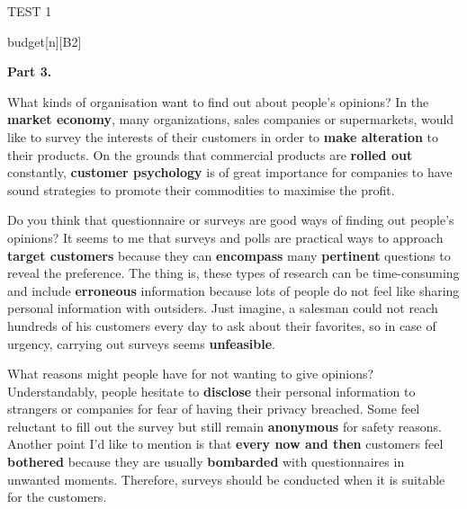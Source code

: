 \begin{glossarymc}[Cambridge 8]
\begin{test}{TEST 1}
\begin{VocabExplain}[Part 2]
            \begin{ExplainCard}{budget}[n][B2]
            \end{ExplainCard}
        \end{VocabExplain}

    \noindent
    \textbf{Part 3.}
    \begin{qa}{What kinds of organisation want to find out about people's opinions?}
    In the \textbf{market economy}, many organizations, sales companies or supermarkets, would like to survey the interests of their customers in order to \textbf{make alteration} to their products. On the grounds that commercial products are \textbf{rolled out} constantly, \textbf{customer psychology} is of great importance for companies to have sound strategies to promote their commodities to maximise the profit.
    \end{qa}

    \begin{qa}{Do you think that questionnaire or surveys are good ways of finding out people's opinions?}
    It seems to me that surveys and polls are practical ways to approach \textbf{target customers} because they can \textbf{encompass} many \textbf{pertinent} questions to reveal the preference. The thing is, these types of research can be time-consuming and include \textbf{erroneous} information because lots of people do not feel like sharing personal information with outsiders. Just imagine, a salesman could not reach hundreds of his customers every day to ask about their favorites, so in case of urgency, carrying out surveys seems \textbf{unfeasible}.
    \end{qa}

    \begin{qa}{What reasons might people have for not wanting to give opinions?}
    Understandably, people hesitate to \textbf{disclose} their personal information to strangers or companies for fear of having their privacy breached. Some feel reluctant to fill out the survey but still remain \textbf{anonymous} for safety reasons. Another point I'd like to mention is that \textbf{every now and then} customers feel \textbf{bothered} because they are usually \textbf{bombarded} with questionnaires in unwanted moments. Therefore, surveys should be conducted when it is suitable for the customers.
    \end{qa}


\end{test}
\end{glossarymc}

